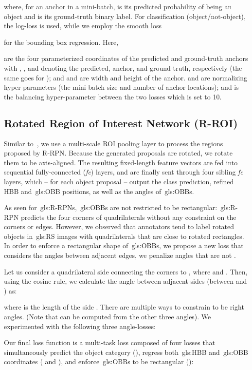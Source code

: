 \documentclass[runningheads]{llncs}
\begin{document}
where, for an anchor  in a mini-batch,  is its predicted probability of being an object and  is its ground-truth binary label. 
For classification (object/not-object), the log-loss  is used, while we employ the smooth  loss

for the bounding box regression. Here, 

are the four parameterized coordinates of the predicted and ground-truth anchors with , , and  denoting the predicted, anchor, and ground-truth, respectively (the same goes for ); and  and  are width and height of the anchor.
     and  are normalizing hyper-parameters (the mini-batch size and number of anchor locations); and  is the balancing hyper-parameter between the two losses which is set to 10.
	
	\subsection{Rotated Region of Interest Network (R-ROI)}
	Similar to~\cite{fpn}, we use a multi-scale ROI pooling layer to process the regions proposed by R-RPN.
    Because the generated proposals are rotated, we rotate them to be axis-aligned.
    The resulting fixed-length feature vectors are fed into sequential fully-connected (\emph{fc}) layers, and are finally sent through four sibling \emph{fc} layers, which -- for each object proposal -- output the class prediction, refined HBB and~\gls{gls:OBB} positions, as well as the angles of~\glspl{gls:OBB}. 
	
	As seen for~\glspl{gls:R-RPN},~\glspl{gls:OBB} are not restricted to be rectangular:~\gls{gls:R-RPN} predicts the four corners of quadrilaterals without any constraint on the corners or edges. 
	However, we observed that annotators tend to label rotated objects in~\gls{gls:RS} images with quadrilaterals that are close to rotated rectangles.
	In order to enforce a rectangular shape of~\glspl{gls:OBB}, we propose a new loss  that considers the angles between adjacent edges, \ie we penalize angles that are not .
    
	Let us consider  a quadrilateral side connecting the corners  to , where  and .
	Then, using the cosine rule, we calculate the angle between adjacent sides (\eg  between  and ) as: 
	
	where  is the length of the side .
	There are multiple ways to constrain  to be right angles. (Note that  can be computed from the other three angles). We experimented with the following three angle-losses:
    
	Our final loss function is a multi-task loss  composed of four losses that simultaneously predict the object category (), regress both~\gls{gls:HBB} and~\gls{gls:OBB} coordinates ( and ), and enforce~\glspl{gls:OBB} to be rectangular ():
	
\end{document}
